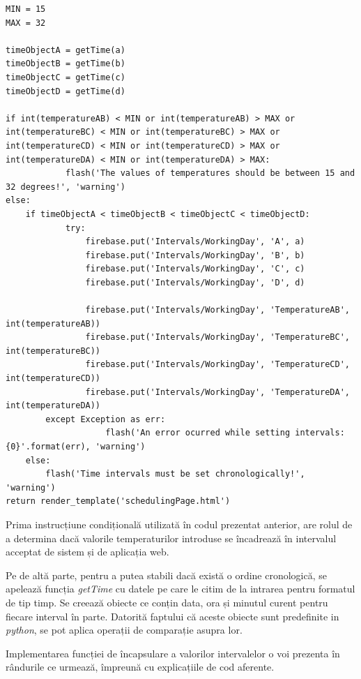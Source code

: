 \vspace{1em}
\begin{lstlisting}
MIN = 15
MAX = 32

timeObjectA = getTime(a)
timeObjectB = getTime(b)
timeObjectC = getTime(c)
timeObjectD = getTime(d)

if int(temperatureAB) < MIN or int(temperatureAB) > MAX or int(temperatureBC) < MIN or int(temperatureBC) > MAX or     			int(temperatureCD) < MIN or int(temperatureCD) > MAX or int(temperatureDA) < MIN or int(temperatureDA) > MAX:
            flash('The values of temperatures should be between 15 and 32 degrees!', 'warning')
else:
	if timeObjectA < timeObjectB < timeObjectC < timeObjectD:
      		try:
              	firebase.put('Intervals/WorkingDay', 'A', a)
              	firebase.put('Intervals/WorkingDay', 'B', b)
              	firebase.put('Intervals/WorkingDay', 'C', c)
              	firebase.put('Intervals/WorkingDay', 'D', d)

              	firebase.put('Intervals/WorkingDay', 'TemperatureAB', int(temperatureAB))
              	firebase.put('Intervals/WorkingDay', 'TemperatureBC', int(temperatureBC))
              	firebase.put('Intervals/WorkingDay', 'TemperatureCD', int(temperatureCD))
              	firebase.put('Intervals/WorkingDay', 'TemperatureDA', int(temperatureDA))
       	except Exception as err:
                	flash('An error ocurred while setting intervals: {0}'.format(err), 'warning')
	else:
		flash('Time intervals must be set chronologically!', 'warning')
return render_template('schedulingPage.html')
\end{lstlisting}
\vspace{2em} 

	Prima instrucțiune condițională utilizată în codul prezentat anterior, are rolul de a determina dacă valorile temperaturilor introduse se încadrează în intervalul acceptat de sistem și de aplicația web.  

	Pe de altă parte, pentru a putea stabili dacă există o ordine cronologică, se apelează funcția \textit{getTime} cu datele pe care le citim de la intrarea pentru formatul de tip timp. Se creează obiecte ce conțin data, ora și minutul curent pentru fiecare interval în parte. Datorită faptului că aceste obiecte sunt predefinite in \textit{python}, se pot aplica operații de comparație asupra lor. 

	Implementarea funcției de încapsulare a valorilor intervalelor o voi prezenta în rândurile ce urmează, împreună cu explicațiile de cod aferente. 

